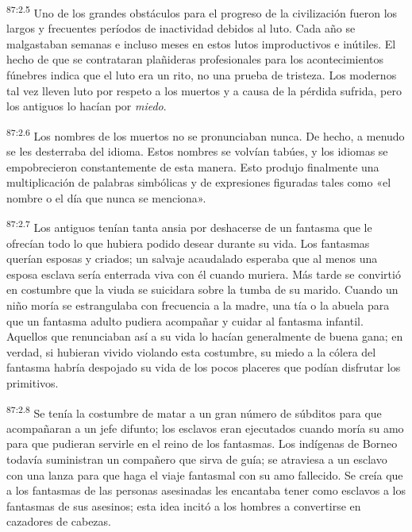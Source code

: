 \par
\textsuperscript{87:2.5} Uno de los grandes obstáculos para el progreso de la civilización fueron los largos y frecuentes períodos de inactividad debidos al luto. Cada año se malgastaban semanas e incluso meses en estos lutos improductivos e inútiles. El hecho de que se contrataran plañideras profesionales para los acontecimientos fúnebres indica que el luto era un rito, no una prueba de tristeza. Los modernos tal vez lleven luto por respeto a los muertos y a causa de la pérdida sufrida, pero los antiguos lo hacían por \textit{miedo}.

\par
\textsuperscript{87:2.6} Los nombres de los muertos no se pronunciaban nunca. De hecho, a menudo se les desterraba del idioma. Estos nombres se volvían tabúes, y los idiomas se empobrecieron constantemente de esta manera. Esto produjo finalmente una multiplicación de palabras simbólicas y de expresiones figuradas tales como «el nombre o el día que nunca se menciona».

\par
\textsuperscript{87:2.7} Los antiguos tenían tanta ansia por deshacerse de un fantasma que le ofrecían todo lo que hubiera podido desear durante su vida. Los fantasmas querían esposas y criados; un salvaje acaudalado esperaba que al menos una esposa esclava sería enterrada viva con él cuando muriera. Más tarde se convirtió en costumbre que la viuda se suicidara sobre la tumba de su marido. Cuando un niño moría se estrangulaba con frecuencia a la madre, una tía o la abuela para que un fantasma adulto pudiera acompañar y cuidar al fantasma infantil. Aquellos que renunciaban así a su vida lo hacían generalmente de buena gana; en verdad, si hubieran vivido violando esta costumbre, su miedo a la cólera del fantasma habría despojado su vida de los pocos placeres que podían disfrutar los primitivos.

\par
\textsuperscript{87:2.8} Se tenía la costumbre de matar a un gran número de súbditos para que acompañaran a un jefe difunto; los esclavos eran ejecutados cuando moría su amo para que pudieran servirle en el reino de los fantasmas. Los indígenas de Borneo todavía suministran un compañero que sirva de guía; se atraviesa a un esclavo con una lanza para que haga el viaje fantasmal con su amo fallecido. Se creía que a los fantasmas de las personas asesinadas les encantaba tener como esclavos a los fantasmas de sus asesinos; esta idea incitó a los hombres a convertirse en cazadores de cabezas.

